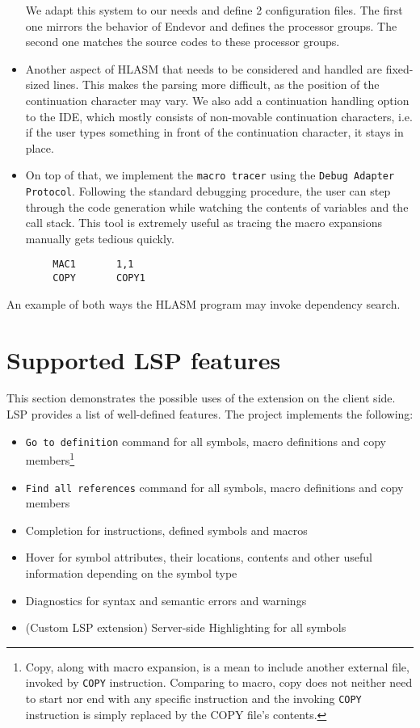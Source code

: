 \begin{itemize}
We adapt this system to our needs and define 2 configuration files. The first one mirrors the behavior of Endevor and defines the processor groups. The second one matches the source codes to these processor groups.

\item Another aspect of HLASM that needs to be considered and handled are fixed-sized lines. This makes the parsing more difficult, as the position of the continuation character may vary. We also add a continuation handling option to the IDE, which mostly consists of non-movable continuation characters, i.e. if the user types something in front of the continuation character, it stays in place.

\item On top of that, we implement the \texttt{macro tracer} using the \texttt{Debug Adapter Protocol}. Following the standard debugging procedure, the user can step through the code generation while watching the contents of variables and the call stack. This tool is extremely useful as tracing the macro expansions manually gets tedious quickly.
\end{itemize}

\pagebreak
\begin{listing}
\begin{verbatim}
        MAC1       1,1                   
        COPY       COPY1
\end{verbatim} 
\caption{An example of both ways the HLASM program may invoke dependency search.}
\label{lst:search}
\end{listing}

\section{Supported LSP features}
This section demonstrates the possible uses of the extension on the client side. LSP provides a list of well-defined features. The project implements the following:

\begin{itemize}
	\item \texttt{Go to definition} command for all symbols, macro definitions and copy members\footnote{Copy, along with macro expansion, is a mean to include another external file, invoked by \texttt{COPY} instruction. Comparing to macro, copy does not neither need to start nor end with any specific instruction and the invoking \texttt{COPY} instruction is simply replaced by the COPY file's contents.}
	\item \texttt{Find all references} command for all symbols, macro definitions and copy members
	\item Completion for instructions, defined symbols and macros
	\item Hover for symbol attributes, their locations, contents and other useful information depending on the symbol type
	\item Diagnostics for syntax and semantic errors and warnings
	\item (Custom LSP extension) Server-side Highlighting for all symbols  
\end{itemize}

